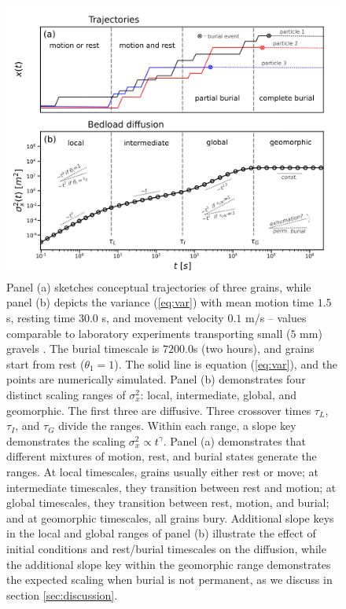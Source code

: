 \begin{figure}[h!]	
	\includegraphics[width=\linewidth,keepaspectratio]{./figures/ch4/diffusion.png}
	\caption{Panel (a) sketches conceptual trajectories of three grains, while panel (b) depicts the variance (\ref{eq:var}) with mean motion time $1.5$ s, resting time $30.0$ s, and movement velocity $0.1$ m/s -- values comparable to laboratory experiments transporting small ($5$ mm) gravels \citep{Lajeunesse2010,Martin2012}. The burial timescale is $7200.0$s (two hours), and grains start from rest ($\theta_1=1$). The solid line is equation (\ref{eq:var}), and the points are numerically simulated. Panel (b) demonstrates four distinct scaling ranges of $\sigma_x^2$: local, intermediate, global, and geomorphic. The first three are diffusive. Three crossover times $\tau_L$, $\tau_I$, and $\tau_G$ divide the ranges. Within each range, a slope key demonstrates the scaling $\sigma_x^2 \propto t^\gamma$. Panel (a) demonstrates that different mixtures of motion, rest, and burial states generate the ranges. At local timescales, grains usually either rest or move; at intermediate timescales, they transition between rest and motion; at global timescales, they transition between rest, motion, and burial; and at geomorphic timescales, all grains bury. Additional slope keys in the local and global ranges of panel (b) illustrate the effect of initial conditions and rest/burial timescales on the diffusion, while the additional slope key within the geomorphic range demonstrates the expected scaling when burial is not permanent, as we discuss in section \ref{sec:discussion}.
	}
	\label{fig:var}
\end{figure}

